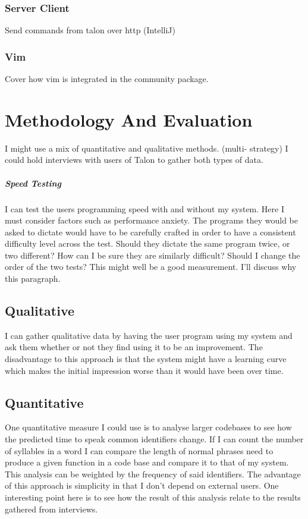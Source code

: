 \documentclass[a4paper,english]{ifimaster}
\begin{document}
\subsection{Server Client}
Send commands from talon over http (IntelliJ)
\subsection{Vim}
Cover how vim is integrated in the community package.

\chapter{Methodology And Evaluation}\label{methodology_and_evaluation}
I might use a mix of quantitative and qualitative methods. (multi- strategy) %
I could hold interviews with users of Talon to gather both types of data.

\paragraph{Speed Testing}
I can test the users programming speed with and without my system.
Here I must consider factors such as performance anxiety.
The programs they would be asked to dictate would have to be carefully crafted in order to have a consistent difficulty level
across the test. 
Should they dictate the same program twice, or two different? How can I be sure they are similarly difficult?
Should I change the order of the two tests?
This might well be a good measurement. I'll discuss why this paragraph.


\section{Qualitative}
I can gather qualitative data by having the user program using my system and ask them whether or not they find using it to be an improvement.
The disadvantage to this approach is that the system might have a learning curve which makes the initial impression
worse than it would have been over time.

\section{Quantitative}
One quantitative measure I could use is to analyse larger codebases to see how the predicted time to speak common identifiers change.
If I can count the number of syllables in a word I can compare the length of normal phrases need to produce a given function in a code base and compare
it to that of my system. This analysis can be weighted by the frequency of said identifiers.
The advantage of this approach is simplicity in that I don't depend on external users.
One interesting point here is to see how the result of this analysis relate to the results gathered from interviews.
\end{document}

